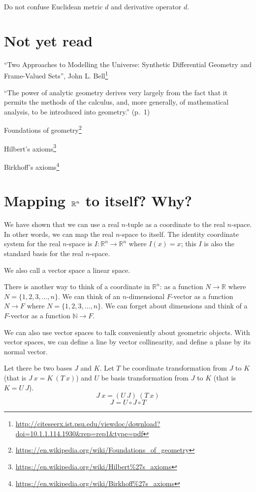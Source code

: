 Do not confuse Euclidean metric \(d\) and derivative operator \(d\).

\section{Not yet read}

\enquote{Two Approaches to Modelling the Universe: Synthetic Differential Geometry and Frame-Valued Sets},
John L. Bell\footnote{\url{http://citeseerx.ist.psu.edu/viewdoc/download?doi=10.1.1.114.1930&rep=rep1&type=pdf}}

\enquote{The power of analytic geometry derives very largely from the fact
that it permits the methods of the calculus, and, more generally, of
mathematical analysis, to be introduced into geometry.} (p.~1)

Foundations of geometry\footnote{\url{https://en.wikipedia.org/wiki/Foundations_of_geometry}}

Hilbert's axioms\footnote{\url{https://en.wikipedia.org/wiki/Hilbert\%27s_axioms}}

Birkhoff's axioms\footnote{\url{https://en.wikipedia.org/wiki/Birkhoff\%27s_axioms}}

\section{Mapping \(\mathbb{R}^n\) to itself? Why?}

We have shown that we can use a real $n$-tuple as a coordinate to the real $n$-space.
In other words, we can map the real $n$-space to itself.
The identity coordinate system for the real $n$-space is
$I : \mathbb{R}^n \to \mathbb{R}^n$ where $I(x) = x$;
this $I$ is also the standard basis for the real $n$-space.

We also call a vector space a linear space.

There is another way to think of a coordinate in $\mathbb{R}^n$:
as a function $N \to \mathbb{R}$ where $N = \{1,2,3,\ldots,n\}$.
We can think of an $n$-dimensional $F$-vector as a function $N \to F$ where $N = \{1,2,3,\ldots,n\}$.
We can forget about dimensions and think of a $F$-vector as a function $\mathbb{N} \to F$.

We can also use vector spaces to talk conveniently about geometric objects.
With vector spaces, we can define a line by vector collinearity,
and define a plane by its normal vector.

Let there be two bases $J$ and $K$.
Let $T$ be coordinate transformation from $J$ to $K$
(that is $J~x = K~(T~x)$)
and $U$ be basis transformation from $J$ to $K$
(that is $K = U~J$).
\[
J~x = (U~J)~(T~x)
\]
\[
J = U \circ J \circ T
\]

